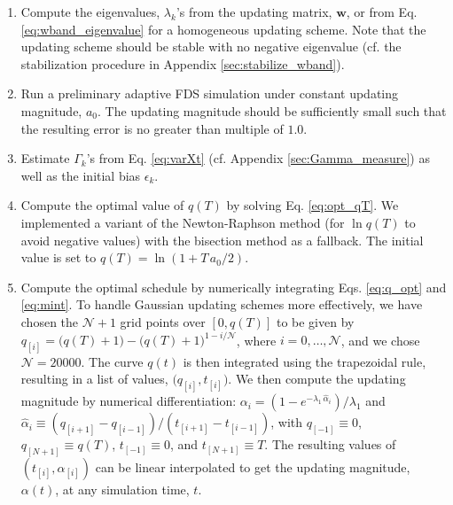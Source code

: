 \documentclass[reprint, superscriptaddress, floatfix]{revtex4-1}
\begin{document}
\begin{enumerate}

\item
Compute the eigenvalues, $\lambda_k$'s
from the updating matrix, $\mathbf w$,
or from Eq. \eqref{eq:wband_eigenvalue}
for a homogeneous updating scheme.
%
Note that
the updating scheme should be stable
with no negative eigenvalue
(cf. the stabilization procedure in Appendix \ref{sec:stabilize_wband}).

\item \label{step:prerun}
Run a preliminary adaptive FDS simulation
under constant updating magnitude, $a_0$.
%
The updating magnitude should be sufficiently small
such that the resulting error is no greater than
multiple of $1.0$.

\item \label{step:gamma}
Estimate $\Gamma_k$'s from Eq. \eqref{eq:varXt}
    (cf. Appendix \ref{sec:Gamma_measure})
    as well as the initial bias $\epsilon_k$.

\item \label{step:qT}
Compute the optimal value of $q(T)$ by solving Eq. \eqref{eq:opt_qT}.
%
We implemented a variant of the Newton-Raphson method\cite{press3rd}
(for $\ln q(T)$ to avoid negative values)
with the bisection method\cite{press3rd} as a fallback.
The initial value is set to $q(T) = \ln(1+T\,a_0/2)$.
%

\item \label{step:alpha}
Compute the optimal schedule by
  numerically integrating Eqs. \eqref{eq:q_opt} and \eqref{eq:mint}.
%
To handle Gaussian updating schemes more effectively,
  we have chosen the $\mathcal N+1$ grid points over $[0, q(T)]$ to be given by
  $q_{[i]} = \bigl(q(T) + 1\bigr) - \bigl(q(T)+1\bigr)^{1-i/\mathcal N}$,
  where $i = 0, \dots, \mathcal N$, and we chose $\mathcal N=20000$.
%
The curve $q(t)$ is then integrated
  using the trapezoidal rule\cite{press3rd},
  resulting in a list of values, $\bigl(q_{[i]}, t_{[i]} \bigr)$.
%
We then compute the updating magnitude by numerical differentiation:
  $\alpha_i = (1 - e^{-\lambda_1 \, \hat \alpha_i})/\lambda_1$
  and
  $\hat \alpha_i \equiv (q_{[i+1]} - q_{[i-1]}) / (t_{[i+1]} - t_{[i-1]})$,
  with
  $q_{[ -1]} \equiv 0$,
  $q_{[N+1]} \equiv q(T)$,
  $t_{[ -1]} \equiv 0$, and
  $t_{[N+1]} \equiv T$.
%
The resulting values of $(t_{[i]}, \alpha_{[i]})$
  can be linear interpolated
  to get the updating magnitude, $\alpha(t)$, at any simulation time, $t$.



\end{enumerate}
\end{document}
